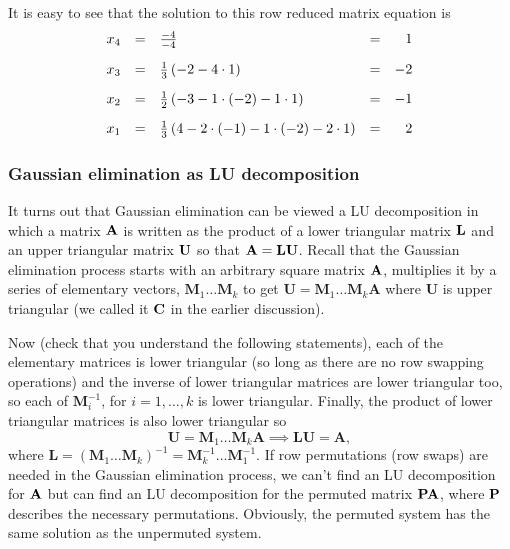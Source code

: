 It is easy to see that the solution to this row reduced matrix equation is
$$\begin{array}{lllcr}
x_4 & = & \frac{-4}{-4} & = & 1\\ \vspace*{-1mm}\\
x_3 & = & \frac{1}{3}\left(-2 - 4\cdot 1\right) & = & -2\\ \vspace*{-1mm}\\
x_2 & = & \frac{1}{2}\left(-3 - 1 \cdot(-2) - 1 \cdot 1\right) & = & -1\\ \vspace*{-1mm}\\
x_1 & = & \frac{1}{3}\left(4 - 2 \cdot(-1) - 1\cdot(-2) - 2\cdot 1 \right) & = & 2
\end{array}$$ \sqend

\subsubsection{Gaussian elimination as LU decomposition}

It turns out that Gaussian elimination can be viewed a LU decomposition in which a matrix $\bf A$ is written as the product of a lower triangular matrix $\bf L$ and an upper triangular matrix $\bf U$ so that $\mathbf  A = \bf LU$.   Recall that the Gaussian elimination process starts with an arbitrary square matrix $\bf A$, multiplies it by a series of elementary vectors, $\mathbf M_1\ldots \mathbf M_k$ to get $\mathbf U = \mathbf M_1\ldots \mathbf M_k \mathbf A $ where $\mathbf U $ is upper triangular (we called it $\bf C$ in the earlier discussion).  


Now (check that you understand the  following statements), each of the elementary matrices is lower triangular (so long as there are no row swapping operations) and the inverse of lower triangular matrices are lower triangular too, so each of $\mathbf M^{-1}_i$, for $i = 1,\ldots,k$ is lower triangular.  Finally, the product of lower triangular matrices is also lower triangular so 
\[
\mathbf U = \mathbf M_1\ldots \mathbf M_k \mathbf A  \implies \mathbf{LU} = \mathbf{A}, 
\]
where $\mathbf L = ( \mathbf M_1 \ldots \mathbf M_k)^{-1} = \mathbf M_k^{-1} \ldots \mathbf M_1^{-1}$.  If row permutations (row swaps) are needed in the Gaussian elimination process, we can't find an LU decomposition for $\bf A$ but can find an LU decomposition for the permuted matrix $\bf PA$, where $\bf P$ describes the necessary permutations. Obviously, the permuted system has the same solution as the unpermuted system.

